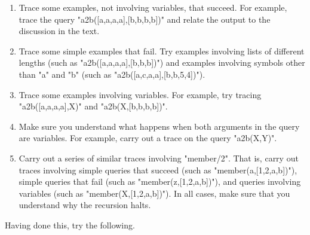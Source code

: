 \begin{enumerate}
\item{}Trace some examples, not involving variables, that succeed. For
example, trace the query "a2b([a,a,a,a],[b,b,b,b])" and relate the
output to the discussion in the text.
\item{}Trace some simple examples that fail. Try
examples involving  lists of different lengths
(such as "a2b([a,a,a,a],[b,b,b])") and
examples involving  symbols other than "a" and "b"
(such as "a2b([a,c,a,a],[b,b,5,4])").
\item{}Trace some examples involving variables. For example, try
tracing "a2b([a,a,a,a],X)" and "a2b(X,[b,b,b,b])".
\item{}Make sure you understand what happens when
both arguments in the query are variables. For example, carry
out a trace on the query "a2b(X,Y)".
\item{}Carry out a series of similar traces involving
"member/2". That is, carry out traces involving simple queries that
succeed (such as "member(a,[1,2,a,b])"), simple queries that fail
(such as "member(z,[1,2,a,b])"), and queries involving variables
(such as "member(X,[1,2,a,b])").  In all cases, make sure that
you understand why the recursion halts.
\end{enumerate}


Having done this, try the following.

